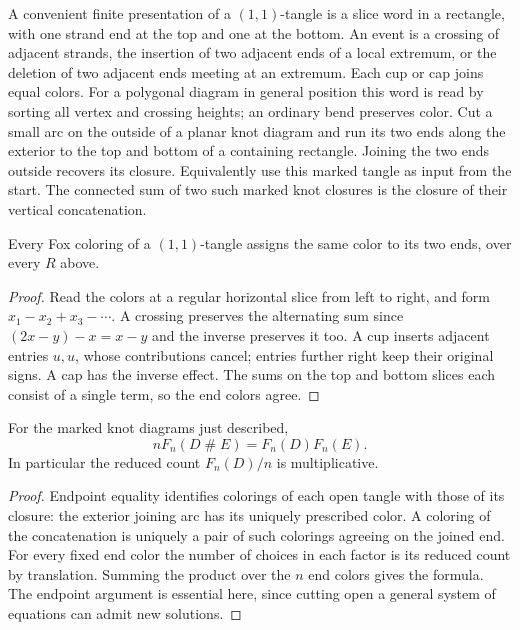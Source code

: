 A convenient finite presentation of a $(1,1)$-tangle is a slice word in a
rectangle, with one strand end at the top and one at the bottom. An event
is a crossing of adjacent strands, the insertion of two adjacent ends of
a local extremum, or the deletion of two adjacent ends meeting at an
extremum. Each cup or cap joins equal colors. For a polygonal diagram
in general position this word is read by sorting all vertex and crossing
heights; an ordinary bend preserves color. Cut a small arc on the outside
of a planar knot diagram and run its two ends along the exterior to the
top and bottom of a containing rectangle. Joining the two ends outside
recovers its closure. Equivalently use this marked tangle as input from
the start. The connected sum of two such marked knot closures is the
closure of their vertical concatenation.

\begin{lemma}
Every Fox coloring of a $(1,1)$-tangle assigns the same color to its two
ends, over every $R$ above.
\end{lemma}
\begin{proof}
Read the colors at a regular horizontal slice from left to right, and form
$x_1-x_2+x_3-\cdots$. A crossing preserves the alternating sum since
$(2x-y)-x=x-y$ and the inverse preserves it too. A cup inserts adjacent
entries $u,u$, whose contributions cancel; entries further right keep
their original signs. A cap has the inverse effect. The sums on the top
and bottom slices each consist of a single term, so the end colors agree.
\end{proof}

\begin{theorem}
For the marked knot diagrams just described,
\[
 n F_n(D\mathbin{\#}E)=F_n(D)F_n(E).
\]
In particular the reduced count $F_n(D)/n$ is multiplicative.
\end{theorem}
\begin{proof}
Endpoint equality identifies colorings of each open tangle with those of
its closure: the exterior joining arc has its uniquely prescribed color.
A coloring of the concatenation is uniquely a pair of such colorings
agreeing on the joined end. For every fixed end color the number of
choices in each factor is its reduced count by translation. Summing the
product over the $n$ end colors gives the formula. The endpoint argument
is essential here, since cutting open a general system of equations can
admit new solutions.
\end{proof}

